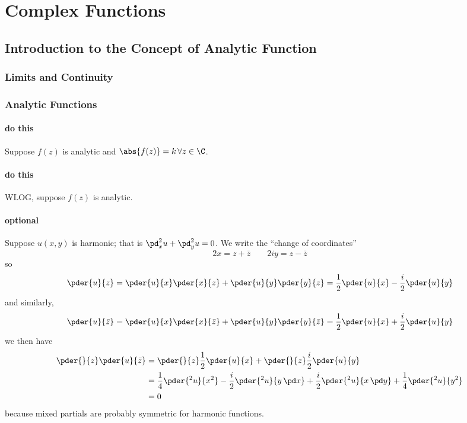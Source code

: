 \chapter{Complex Functions}\label{ch:cfn}
\section{Introduction to the Concept of Analytic Function}
\subsection{Limits and Continuity}

\subsection{Analytic Functions}
\subsubsection{}
\subsubsection{}
\subsubsection{}
\subsubsection{do this}
Suppose \(f(z)\) is analytic and \(\abs{f(z)}=k\,\forall z\in\C\).
\subsubsection{do this}
WLOG, suppose \(f(z)\) is analytic. 
\subsubsection{}
\subsubsection{optional}
Suppose \(u(x,y)\) is harmonic; that is \(\pd_x^2 u + \pd_y^2 u = 0\). We write the ``change of coordinates''
\[2x = z+\bar z\qquad 2iy = z-\bar z\]
so
\[\pder{u}{z} = \pder{u}{x}\pder{x}{z}+\pder{u}{y}\pder{y}{z} = \frac{1}{2}\pder{u}{x}-\frac{i}{2}\pder{u}{y}\]
and similarly,
\[\pder{u}{\bar z} = \pder{u}{x}\pder{x}{\bar z}+\pder{u}{y}\pder{y}{\bar z} = \frac{1}{2}\pder{u}{x}+\frac{i}{2}\pder{u}{y}\]
we then have
\begin{align*}
	\pder{}{z}\pder{u}{\bar z} &= \pder{}{z}\frac{1}{2}\pder{u}{x}+\pder{}{z}\frac{i}{2}\pder{u}{y}\\
				   &=\frac{1}{4}\pder{^2u}{x^2}-\frac{i}{2}\pder{^2u}{y\,\pd x} + \frac{i}{2}\pder{^2u}{x\,\pd y}+\frac{1}{4}\pder{^2u}{y^2}\\
				   &=0
\end{align*}
because mixed partials are probably symmetric for harmonic functions.
